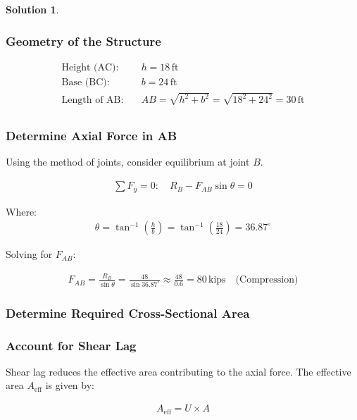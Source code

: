 \documentclass[12pt]{article}
\theoremstyle{definition} %
\newtheorem{solution}{Solution}
\theoremstyle{plain} %
\begin{document}
\begin{solution}
\begin{enumerate}
\subsubsection*{Geometry of the Structure}

\begin{align}
\text{Height (AC)}: & \quad h = 18 \, \text{ft} \\
\text{Base (BC)}: & \quad b = 24 \, \text{ft} \\
\text{Length of AB}: & \quad AB = \sqrt{h^2 + b^2} = \sqrt{18^2 + 24^2} = 30 \, \text{ft} \\
\end{align}

\subsubsection*{Determine Axial Force in AB}

Using the method of joints, consider equilibrium at joint \( B \).

\begin{align}
\sum F_y = 0: \quad R_B - F_{AB} \sin{\theta} = 0 \tag{2}
\end{align}

Where:
\begin{align}
\theta = \tan^{-1}\left( \frac{h}{b} \right) = \tan^{-1}\left( \frac{18}{24} \right) = 36.87^\circ
\end{align}

Solving for \( F_{AB} \):

\begin{align}
F_{AB} = \frac{R_B}{\sin{\theta}} = \frac{48}{\sin{36.87^\circ}} \approx \frac{48}{0.6} = 80 \, \text{kips} \quad \text{(Compression)}
\end{align}

\subsubsection*{Determine Required Cross-Sectional Area}

\subsubsection*{Account for Shear Lag}

Shear lag reduces the effective area contributing to the axial force. The effective area \( A_{\text{eff}} \) is given by:

\begin{align}
A_{\text{eff}} = U \times A
\end{align}


\end{enumerate}
\end{solution}
\end{document}
